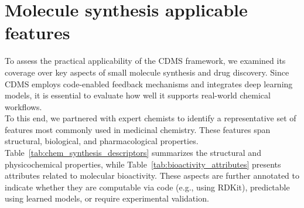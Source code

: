 \documentclass[10pt]{article} %
\begin{document}
\section{Molecule synthesis applicable features}
\label{app:cdms_applicable_features}
To assess the practical applicability of the CDMS framework, we examined its coverage over key aspects of small molecule synthesis and drug discovery. Since CDMS employs code-enabled feedback mechanisms and integrates deep learning models, it is essential to evaluate how well it supports real-world chemical workflows.\\
To this end, we partnered with expert chemists to identify a representative set of features most commonly used in medicinal chemistry. These features span structural, biological, and pharmacological properties. Table~\ref{tab:chem_synthesis_descriptors} summarizes the structural and physicochemical properties, while Table~\ref{tab:bioactivity_attributes} presents attributes related to molecular bioactivity. These aspects are further annotated to indicate whether they are computable via code (e.g., using RDKit), predictable using learned models, or require experimental validation.
\end{document}
